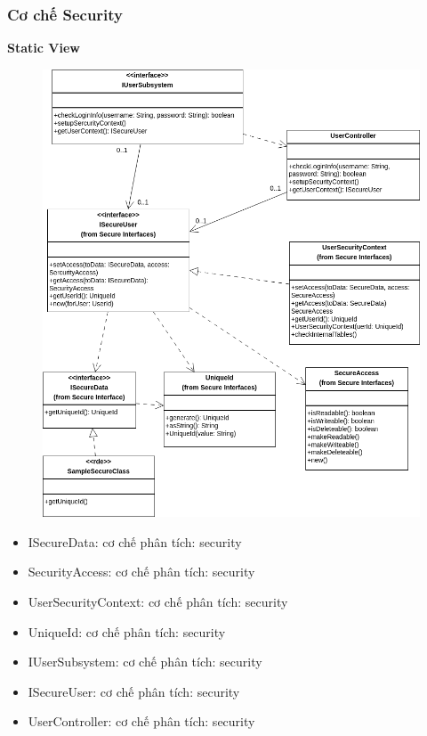 \subsubsection{Cơ chế Security}
\textbf{Static View}
\begin{figure}[H]
    \centering
    \includegraphics[width=0.8\linewidth]{img3.1.2/design mechanism-Sercurity.drawio.png}
\end{figure}
\begin{itemize}
    \item ISecureData: cơ chế phân tích: security
    \item SecurityAccess: cơ chế phân tích: security
    \item UserSecurityContext: cơ chế phân tích: security
    \item UniqueId: cơ chế phân tích: security
    \item IUserSubsystem: cơ chế phân tích: security
    \item ISecureUser: cơ chế phân tích: security
    \item UserController: cơ chế phân tích: security
\end{itemize}

